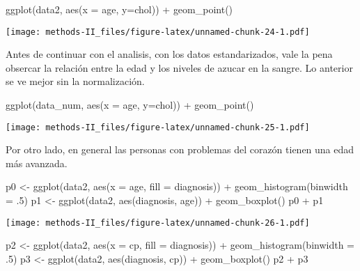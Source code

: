 \documentclass[
]{article}
\newenvironment{Shaded}{\begin{snugshade}}{\end{snugshade}}
\newcommand{\AttributeTok}[1]{\textcolor[rgb]{0.77,0.63,0.00}{#1}}
\newcommand{\DecValTok}[1]{\textcolor[rgb]{0.00,0.00,0.81}{#1}}
\newcommand{\FunctionTok}[1]{\textcolor[rgb]{0.00,0.00,0.00}{#1}}
\newcommand{\NormalTok}[1]{#1}
\newcommand{\OtherTok}[1]{\textcolor[rgb]{0.56,0.35,0.01}{#1}}
\newcommand{\SpecialCharTok}[1]{\textcolor[rgb]{0.00,0.00,0.00}{#1}}
\begin{document}
\begin{Shaded}
\begin{Highlighting}[]
\FunctionTok{ggplot}\NormalTok{(data2, }
       \FunctionTok{aes}\NormalTok{(}\AttributeTok{x =}\NormalTok{ age, }
           \AttributeTok{y=}\NormalTok{chol)) }\SpecialCharTok{+}
\FunctionTok{geom\_point}\NormalTok{()}
\end{Highlighting}
\end{Shaded}

\texttt{[image: methods-II\_files/figure-latex/unnamed-chunk-24-1.pdf]}

Antes de continuar con el analisis, con los datos estandarizados, vale
la pena obsercar la relación entre la edad y los niveles de azucar en la
sangre. Lo anterior se ve mejor sin la normalización.

\begin{Shaded}
\begin{Highlighting}[]
\FunctionTok{ggplot}\NormalTok{(data\_num, }
       \FunctionTok{aes}\NormalTok{(}\AttributeTok{x =}\NormalTok{ age, }
           \AttributeTok{y=}\NormalTok{chol)) }\SpecialCharTok{+}
\FunctionTok{geom\_point}\NormalTok{()}
\end{Highlighting}
\end{Shaded}

\texttt{[image: methods-II\_files/figure-latex/unnamed-chunk-25-1.pdf]}

Por otro lado, en general las personas con problemas del corazón tienen
una edad más avanzada.

\begin{Shaded}
\begin{Highlighting}[]
\NormalTok{p0 }\OtherTok{\textless{}{-}} \FunctionTok{ggplot}\NormalTok{(data2, }\FunctionTok{aes}\NormalTok{(}\AttributeTok{x =}\NormalTok{ age, }\AttributeTok{fill =}\NormalTok{ diagnosis)) }\SpecialCharTok{+}
\FunctionTok{geom\_histogram}\NormalTok{(}\AttributeTok{binwidth =}\NormalTok{ .}\DecValTok{5}\NormalTok{)}
\NormalTok{p1 }\OtherTok{\textless{}{-}} \FunctionTok{ggplot}\NormalTok{(data2, }\FunctionTok{aes}\NormalTok{(diagnosis, age)) }\SpecialCharTok{+} \FunctionTok{geom\_boxplot}\NormalTok{()}
\NormalTok{p0 }\SpecialCharTok{+}\NormalTok{ p1}
\end{Highlighting}
\end{Shaded}

\texttt{[image: methods-II\_files/figure-latex/unnamed-chunk-26-1.pdf]}

\begin{Shaded}
\begin{Highlighting}[]
\NormalTok{p2 }\OtherTok{\textless{}{-}} \FunctionTok{ggplot}\NormalTok{(data2, }\FunctionTok{aes}\NormalTok{(}\AttributeTok{x =}\NormalTok{ cp, }\AttributeTok{fill =}\NormalTok{ diagnosis)) }\SpecialCharTok{+}
\FunctionTok{geom\_histogram}\NormalTok{(}\AttributeTok{binwidth =}\NormalTok{ .}\DecValTok{5}\NormalTok{)}
\NormalTok{p3 }\OtherTok{\textless{}{-}} \FunctionTok{ggplot}\NormalTok{(data2, }\FunctionTok{aes}\NormalTok{(diagnosis, cp)) }\SpecialCharTok{+} \FunctionTok{geom\_boxplot}\NormalTok{()}
\NormalTok{p2 }\SpecialCharTok{+}\NormalTok{ p3}
\end{Highlighting}
\end{Shaded}
\end{document}
